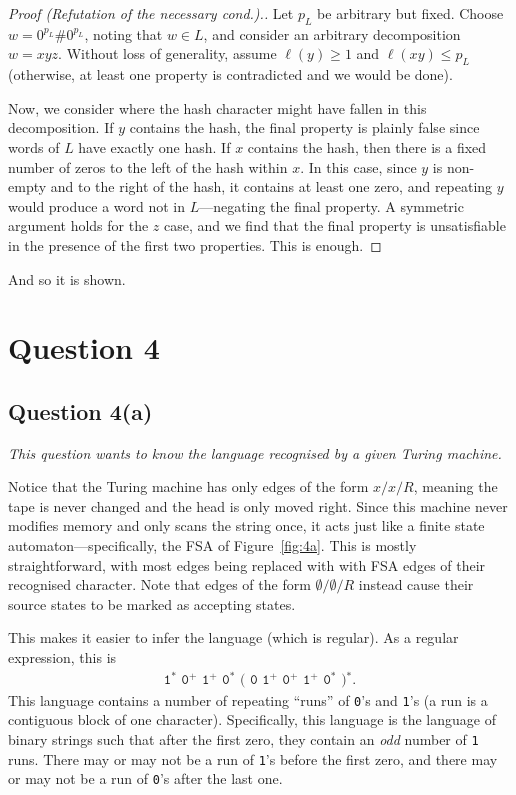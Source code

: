 \documentclass[a4paper]{article}
\begin{document}
\begin{proof}[Proof \textrm{(Refutation of the necessary cond.)}.]
Let $p_L$ be arbitrary but fixed.
Choose $w = 0^{p_L}\#0^{p_L}$, noting that $w \in L$, and consider an arbitrary decomposition $w=xyz$.
Without loss of generality, assume $\ell(y) \ge 1$ and $\ell(xy) \le p_L$ (otherwise, at least one property is contradicted and we would be done).

Now, we consider where the hash character might have fallen in this decomposition.
If $y$ contains the hash, the final property is plainly false since words of $L$ have exactly one hash.
If $x$ contains the hash, then there is a fixed number of zeros to the left of the hash within $x$.
In this case, since $y$ is non-empty and to the right of the hash,
it contains at least one zero, and repeating $y$ would produce a word not in
$L$---negating the final property.
A symmetric argument holds for the $z$ case, and
we find that the final property is unsatisfiable in the presence of the first two properties.
This is enough.
\end{proof}

\noindent And so it is shown.



\newpage
\section*{Question 4}
\subsection*{Question 4(a)}
\begin{center}
  \textit{
    This question wants to know the language recognised by a given Turing machine.
  }
\end{center}
Notice that the Turing machine has only edges of the form $x/x/R$,
meaning the tape is never changed and the head is only moved right.
Since this machine never modifies memory and only scans the string once,
it acts just like a finite state automaton---specifically,
the FSA of Figure~\ref{fig:4a}.
This is mostly straightforward, with most edges being replaced with
with FSA edges of their recognised character.
Note that edges of the form $\emptyset/\emptyset/R$
instead cause their source states to be marked as accepting states.

This makes it easier to infer the language (which is regular).
As a regular expression, this is
\begin{align*}
  \texttt{1$^*$ 0$^+$ 1$^+$ 0$^*$ ( 0 1$^+$ 0$^+$ 1$^+$ 0$^*$ )$^*$}.
\end{align*}
This language contains a number of repeating ``runs'' of 
\texttt{0}'s and \texttt{1}'s (a run is a contiguous block of one character).
Specifically, this language is the language of binary strings such that
after the first zero, they contain an \textit{odd} number of \texttt 1 runs.
There may or may not be a run of \texttt 1's before the first zero,
and there may or may not be a run of \texttt 0's after the last one.
\end{document}
